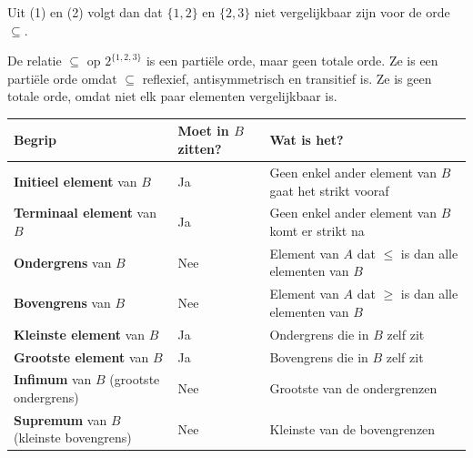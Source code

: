 \begin{niceexample}
    \vspace{0.25cm}

    Uit (1) en (2) volgt dan dat $\{1,2\}$ en $\{2,3\}$ niet vergelijkbaar zijn voor de orde $\subseteq$.

    \vspace{0.25cm}

     De relatie $\subseteq$ op $2^{\{1,2,3\}}$ is een partiële orde, maar geen totale orde. Ze is een partiële orde omdat $\subseteq$ reflexief, antisymmetrisch en transitief is. Ze is geen totale orde, omdat niet elk paar elementen vergelijkbaar is.
\end{niceexample}


\begin{center}
    \renewcommand{\arraystretch}{1.5}
    \begin{tabularx}{\linewidth}{@{} >{\hsize}L >{\hsize}L >{\hsize}L @{}}
        \textbf{Begrip} & \textbf{Moet in $B$ zitten?} & \textbf{Wat is het?} \\
        \hline
        \textbf{Initieel element} van $B$ & Ja & Geen enkel ander element van $B$ gaat het strikt vooraf \\
        \thinrule
        \textbf{Terminaal element} van $B$ & Ja & Geen enkel ander element van $B$ komt er strikt na \\
        \thinrule
        \textbf{Ondergrens} van $B$ & Nee & Element van $A$ dat $\le$ is dan alle elementen van $B$ \\
        \thinrule
        \textbf{Bovengrens} van $B$ & Nee & Element van $A$ dat $\ge$ is dan alle elementen van $B$ \\
        \thinrule
        \textbf{Kleinste element} van $B$ & Ja & Ondergrens die in $B$ zelf zit \\
        \thinrule
        \textbf{Grootste element} van $B$ & Ja & Bovengrens die in $B$ zelf zit \\
        \thinrule
        \textbf{Infimum} van $B$ (grootste ondergrens) & Nee & Grootste van de ondergrenzen \\
        \thinrule
        \textbf{Supremum} van $B$ (kleinste bovengrens) & Nee & Kleinste van de bovengrenzen \\
        \hline
    \end{tabularx}
\end{center}

